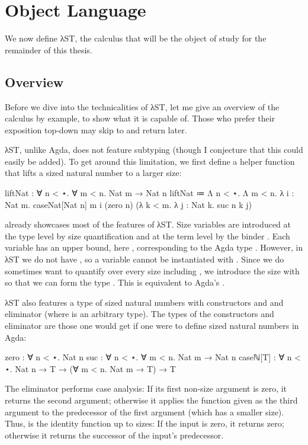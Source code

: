 \chapter{Object Language}
\label{sec:source}

We now define λST, the calculus that will be the object of study for the
remainder of this thesis.


\section{Overview}
\label{sec:source:overview}

Before we dive into the technicalities of λST, let me give an overview of the
calculus by example, to show what it is capable of. Those who prefer their
exposition top-down may skip to  and return later.

λST, unlike Agda, does not feature subtyping (though I conjecture that this
could easily be added). To get around this limitation, we first define a
helper function that lifts a sized natural number to a larger size:
\begin{code}
  liftNat : ∀ n < ⋆. ∀ m < n. Nat m → Nat n
  liftNat ≔ Λ n < ⋆. Λ m < n. λ i : Nat m.
              caseNat[Nat n] m i
                (zero n)
                (λ k < m. λ j : Nat k. suc n k j)
\end{code}

 already showcases most of the features of λST. Size variables
are introduced at the type level by size quantification  and at
the term level by the binder . Each variable has an upper bound,
here , corresponding to the Agda type . However, in λST
we do not have , so a variable  cannot be instantiated
with . Since we do sometimes want to quantify over every size including
, we introduce the size  with  so that we can
form the type . This is equivalent to Agda's
.

λST also features a type of sized natural numbers  with
constructors  and  and eliminator 
(where  is an arbitrary type). The types of the constructors and
eliminator are those one would get if one were to define sized natural numbers
in Agda:
\begin{code}
  zero     : ∀ n < ⋆. Nat n
  suc      : ∀ n < ⋆. ∀ m < n. Nat m → Nat n
  caseℕ[T] : ∀ n < ⋆. Nat n → T → (∀ m < n. Nat m → T) → T
\end{code}
The  eliminator performs case analysis: If its first non-size
argument is zero, it returns the second argument; otherwise it applies the
function given as the third argument to the predecessor of the first argument
(which has a smaller size). Thus,  is the identity function up to
sizes: If the input is zero, it returns zero; otherwise it returns the successor
of the input's predecessor.

